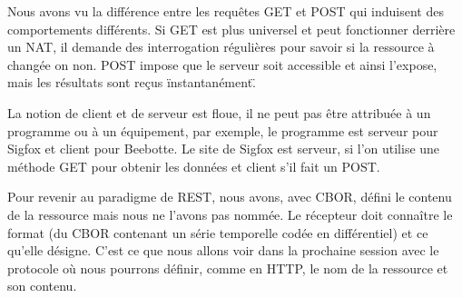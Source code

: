       \vspace{1em}

Nous avons vu la différence entre les requêtes GET et POST qui induisent des comportements différents. Si GET est plus universel et peut fonctionner derrière un NAT, il demande des interrogation régulières pour savoir si la ressource à changée on non. POST impose que le serveur soit accessible et ainsi l'expose, mais les résultats sont reçus \"instantanément\". 

      \vspace{1em}
      
La notion de client et de serveur est floue, il ne peut pas être attribuée à un programme ou à un équipement, par exemple, le programme  est serveur pour Sigfox et client pour Beebotte. Le site de Sigfox est serveur, si l'on utilise une méthode GET pour obtenir les données et client s'il fait un POST.
      
      \vspace{1em}

Pour revenir au paradigme de REST, nous avons, avec CBOR, défini le contenu de la ressource mais nous ne l'avons pas nommée. Le récepteur doit connaître le format (du CBOR contenant un série temporelle codée en différentiel) et ce qu'elle désigne.  C'est ce que nous allons voir dans la prochaine session avec le protocole  où nous pourrons définir, comme en HTTP, le nom de la ressource et son contenu.